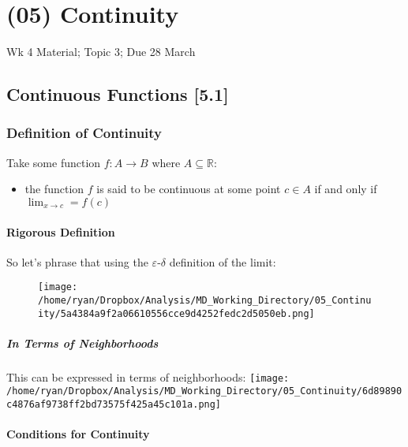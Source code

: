 \documentclass[
]{article}
\date{}
\begin{document}
\hypertarget{header-n3879}{%
\section{(05) Continuity}\label{header-n3879}}

Wk 4 Material; Topic 3; Due 28 March

\tableofcontents

\newpage
\hypertarget{header-n3882}{%
\subsection{Continuous Functions {[}5.1{]}}\label{header-n3882}}

\hypertarget{header-n3883}{%
\subsubsection{Definition of Continuity}\label{header-n3883}}

Take some function \(f: A \rightarrow B\) where
\(A \subseteq \mathbb{R}\):

\begin{itemize}
\item
  the function \(f\) is said to be continuous at some point \(c\in A\)
  if and only if \(\lim_{x\rightarrow c} = f(c)\)
\end{itemize}

\hypertarget{header-n3888}{%
\paragraph{Rigorous Definition}\label{header-n3888}}

So let's phrase that using the \(\varepsilon\)-\(\delta\) definition of
the limit:

\begin{figure}
\centering
\texttt{[image: /home/ryan/Dropbox/Analysis/MD\_Working\_Directory/05\_Continuity/5a4384a9f2a06610556cce9d4252fedc2d5050eb.png]}
\caption{}
\end{figure}

\hypertarget{header-n3891}{%
\subparagraph{In Terms of Neighborhoods}\label{header-n3891}}

This can be expressed in terms of neighborhoods:
\texttt{[image: /home/ryan/Dropbox/Analysis/MD\_Working\_Directory/05\_Continuity/6d89890c4876af9738ff2bd73575f425a45c101a.png]}

\newpage
\hypertarget{header-n3893}{%
\paragraph{Conditions for Continuity}\label{header-n3893}}
\end{document}
